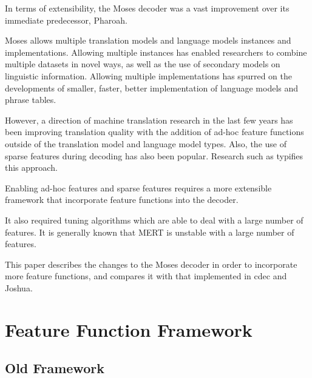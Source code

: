 \documentclass{pbml}
\begin{document}

In terms of extensibility, the Moses\cite{koehn-EtAl:2007:PosterDemo} decoder was a vast improvement over its immediate predecessor, Pharoah\cite{Koehn:Pharaoh:2004}. 

Moses allows multiple translation models and language models instances and implementations. Allowing multiple instances has enabled researchers to combine multiple datasets in novel ways, as well as the use of secondary models on linguistic information\cite{Koehn:Philipp:2007, Sennrich:Rico:2011,Koehn:Philipp:2012}. Allowing multiple implementations has spurred on the developments of smaller, faster, better implementation of language models and phrase tables\cite{talbot-osborne:2007:ACLMain, Heafield-kenlm, Junczys-Dowmunt:Marcin:2012}.

However, a direction of machine translation research in the last few years has been improving translation quality with the addition of ad-hoc feature functions outside of the translation model and language model types. Also, the use of sparse features during decoding has also been popular. Research such as \cite{chiang-knight-wang:2009:NAACLHLT09, cherry:2013:NAACL-HLT} typifies this approach.

Enabling ad-hoc features and sparse features requires a more extensible framework that incorporate feature functions into the decoder.

It also required tuning algorithms which are able to deal with a large number of features. It is generally known that MERT is unstable with a large number of features.

This paper describes the changes to the Moses decoder in order to incorporate more feature functions, and compares it with that implemented in cdec\cite{Dyer_etal_2010} and Joshua\cite{Joshua-Decoder}.

\section{Feature Function Framework}
\subsection{Old Framework}
\end{document}
